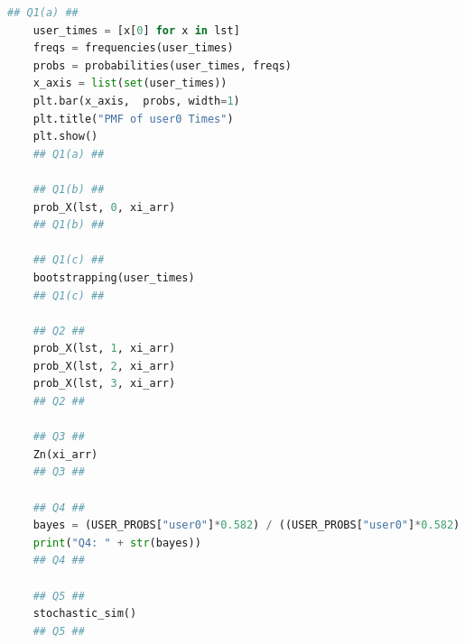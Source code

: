 \documentclass[a4paper,11pt]{article}
\theoremstyle{mytheor}
\begin{document}
\begin{lstlisting}[language=Python]
    ## Q1(a) ##
    user_times = [x[0] for x in lst]
    freqs = frequencies(user_times)
    probs = probabilities(user_times, freqs)
    x_axis = list(set(user_times))
    plt.bar(x_axis,  probs, width=1)
    plt.title("PMF of user0 Times")
    plt.show()
    ## Q1(a) ##

    ## Q1(b) ##
    prob_X(lst, 0, xi_arr)
    ## Q1(b) ##

    ## Q1(c) ##
    bootstrapping(user_times)
    ## Q1(c) ##

    ## Q2 ##
    prob_X(lst, 1, xi_arr)
    prob_X(lst, 2, xi_arr)
    prob_X(lst, 3, xi_arr)
    ## Q2 ##

    ## Q3 ##
    Zn(xi_arr)
    ## Q3 ##

    ## Q4 ##
    bayes = (USER_PROBS["user0"]*0.582) / ((USER_PROBS["user0"]*0.582) + (0.418*0.902575163))
    print("Q4: " + str(bayes))
    ## Q4 ##

    ## Q5 ##
    stochastic_sim()
    ## Q5 ##
\end{lstlisting}
\end{document}

